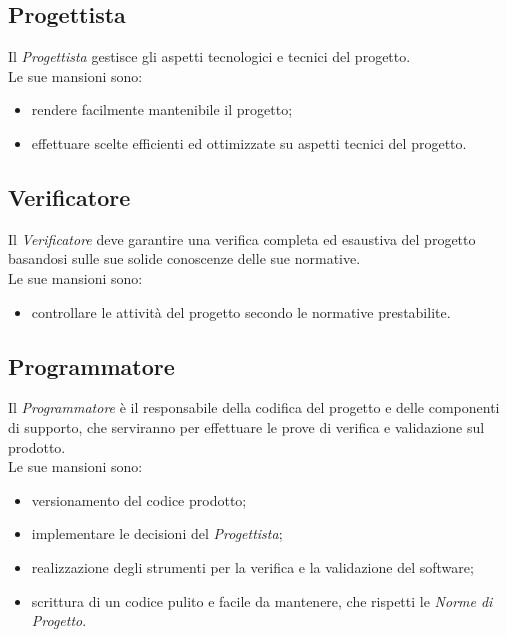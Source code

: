 \documentclass[./../NomeDocumento.tex]{subfiles}
\begin{document}
	\subsection {Progettista}
	
	Il \textit{Progettista} gestisce gli aspetti tecnologici e tecnici del progetto.
	\\ \noindent Le sue mansioni sono:
	
	\begin{itemize}
		\item rendere facilmente mantenibile il progetto;
		\item effettuare scelte efficienti ed ottimizzate su aspetti tecnici del progetto.
	\end{itemize}
	
	\subsection {Verificatore}
	
	Il \textit{Verificatore} deve garantire una verifica completa ed esaustiva del progetto basandosi sulle sue solide conoscenze delle sue normative.
	\\ \noindent Le sue mansioni sono:
	\begin{itemize}
		\item controllare le attività del progetto secondo le normative prestabilite.
	\end{itemize}
	
	\subsection {Programmatore}
	
	Il \textit{Programmatore} è il responsabile della codifica del progetto e delle componenti di supporto, che serviranno per effettuare le prove di verifica e validazione sul prodotto.
	\\ \noindent Le sue mansioni sono:
	
	\begin{itemize}
		\item versionamento del codice prodotto;
		\item implementare le decisioni del \textit{Progettista};
		\item realizzazione degli strumenti per la verifica e la validazione del software;
		\item scrittura di un codice pulito e facile da mantenere, che rispetti le \textit{Norme di Progetto}.
	\end{itemize}
	
\end{document}
